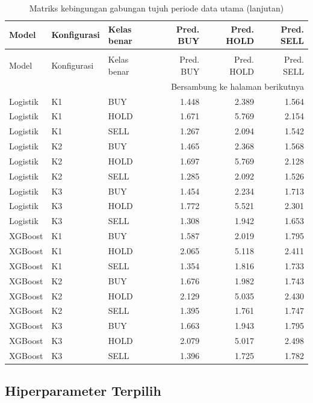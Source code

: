 \begingroup
\small
\setlength{\tabcolsep}{4pt}
\begin{longtable}{lllrrr}
\caption{Matriks kebingungan gabungan tujuh periode data utama}\label{tab:hasil-matriks-gabungan}\\
\toprule
Model & Konfigurasi & Kelas benar & Pred. BUY & Pred. HOLD & Pred. SELL \\
\midrule
\endfirsthead
\caption[]{Matriks kebingungan gabungan tujuh periode data utama (lanjutan)}\\
\toprule
Model & Konfigurasi & Kelas benar & Pred. BUY & Pred. HOLD & Pred. SELL \\
\midrule
\endhead
\midrule
\multicolumn{6}{r}{Bersambung ke halaman berikutnya} \\
\endfoot
\endlastfoot
Logistik & K1 & BUY & 1.448 & 2.389 & 1.564 \\
Logistik & K1 & HOLD & 1.671 & 5.769 & 2.154 \\
Logistik & K1 & SELL & 1.267 & 2.094 & 1.542 \\
Logistik & K2 & BUY & 1.465 & 2.368 & 1.568 \\
Logistik & K2 & HOLD & 1.697 & 5.769 & 2.128 \\
Logistik & K2 & SELL & 1.285 & 2.092 & 1.526 \\
Logistik & K3 & BUY & 1.454 & 2.234 & 1.713 \\
Logistik & K3 & HOLD & 1.772 & 5.521 & 2.301 \\
Logistik & K3 & SELL & 1.308 & 1.942 & 1.653 \\
XGBoost & K1 & BUY & 1.587 & 2.019 & 1.795 \\
XGBoost & K1 & HOLD & 2.065 & 5.118 & 2.411 \\
XGBoost & K1 & SELL & 1.354 & 1.816 & 1.733 \\
XGBoost & K2 & BUY & 1.676 & 1.982 & 1.743 \\
XGBoost & K2 & HOLD & 2.129 & 5.035 & 2.430 \\
XGBoost & K2 & SELL & 1.395 & 1.761 & 1.747 \\
XGBoost & K3 & BUY & 1.663 & 1.943 & 1.795 \\
XGBoost & K3 & HOLD & 2.079 & 5.017 & 2.498 \\
XGBoost & K3 & SELL & 1.396 & 1.725 & 1.782 \\
\bottomrule
\end{longtable}
\endgroup


\subsection{Hiperparameter Terpilih}

